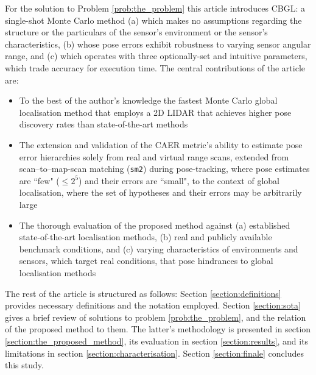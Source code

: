 For the solution to Problem \ref{prob:the_problem} this article introduces
CBGL: a single-shot Monte Carlo method
(a) which makes no assumptions regarding the structure or the particulars of the
sensor's environment or the sensor's characteristics,
(b) whose pose errors exhibit robustness to varying sensor angular range, and
(c) which operates with three optionally-set and intuitive parameters, which
trade accuracy for execution time.
The central contributions of the article are:
\begin{itemize}
  \item To the best of the author's knowledge the fastest Monte Carlo global
        localisation method that employs a 2D LIDAR that achieves higher
        pose discovery rates than state-of-the-art methods
  \item The extension and validation of the CAER metric's ability to estimate
        pose error hierarchies solely from real and virtual range scans,
        extended from scan--to--map-scan matching (\texttt{sm2}) during
        pose-tracking, where pose estimates are ``few" ($\leq$$2^5$) and
        their errors are ``small", to the context of global localisation, where
        the set of hypotheses and their errors may be arbitrarily large
  \item The thorough evaluation of the proposed method against (a) established
        state-of-the-art localisation methods, (b) real and publicly available
        benchmark conditions, and (c) varying characteristics of environments
        and sensors, which target real conditions, that pose hindrances to
        global localisation methods
\end{itemize}

The rest of the article is structured as follows: Section
\ref{section:definitions} provides necessary definitions and the notation
employed. Section \ref{section:sota} gives a brief review of
solutions to problem \ref{prob:the_problem}, and the relation of the proposed
method to them. The latter's methodology is presented in section
\ref{section:the_proposed_method}, its evaluation in section
\ref{section:results}, and its limitations in section
\ref{section:characterisation}. Section \ref{section:finale} concludes this
study.
